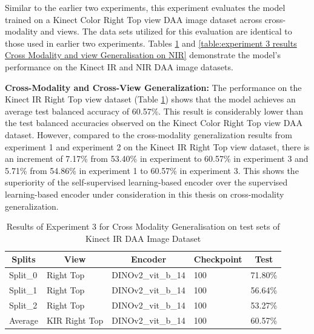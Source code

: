 Similar to the earlier two experiments, this experiment evaluates the model trained on a Kinect Color Right Top view DAA image dataset across cross-modality and views. The data sets utilized for this evaluation are identical to those used in earlier two experiments. Tables \ref{table:experiment 3 results Cross Modality Generalisation} and \ref{table:experiment 3 results Cross Modality and view Generalisation on NIR} demonstrate the model's performance on the Kinect IR and NIR DAA image datasets.

\textbf{Cross-Modality and Cross-View Generalization:}
The performance on the Kinect IR Right Top view dataset (Table \ref{table:experiment 3 results Cross Modality Generalisation}) shows that the model achieves an average test balanced accuracy of 60.57\%. This result is considerably lower than the test balanced accuracies observed on the Kinect Color Right Top view DAA dataset. However, compared to the cross-modality generalization results from experiment 1 and experiment 2 on the Kinect IR Right Top view dataset, there is an increment of 7.17\% from 53.40\% in experiment to 60.57\% in experiment 3 and 5.71\% from 54.86\% in experiment 1 to 60.57\% in experiment 3. This shows the superiority of the self-supervised learning-based encoder over the supervised learning-based encoder under consideration in this thesis on cross-modality generalization.
\begin{table}[htbp]
\caption{Results of Experiment 3 for Cross Modality Generalisation on test sets of Kinect IR DAA Image Dataset}
\label{table:experiment 3 results Cross Modality Generalisation}
\centering
\begin{tabular}{lllll}
\multicolumn{1}{c}{\textbf{Splits}} & \multicolumn{1}{c}{\textbf{View}} & \multicolumn{1}{c}{\textbf{Encoder}} & \multicolumn{1}{c}{\textbf{Checkpoint}} & \multicolumn{1}{c}{\textbf{Test}}\\
\hline
Split\_0 & Right Top & DINOv2\_vit\_b\_14 & 100 & 71.80\% \\
Split\_1 & Right Top & DINOv2\_vit\_b\_14 & 100 & 56.64\% \\
Split\_2 & Right Top & DINOv2\_vit\_b\_14 & 100 & 53.27\% \\
\hline
Average & KIR Right Top & DINOv2\_vit\_b\_14 & 100 & 60.57\% \\
\hline
\end{tabular}
\end{table}

